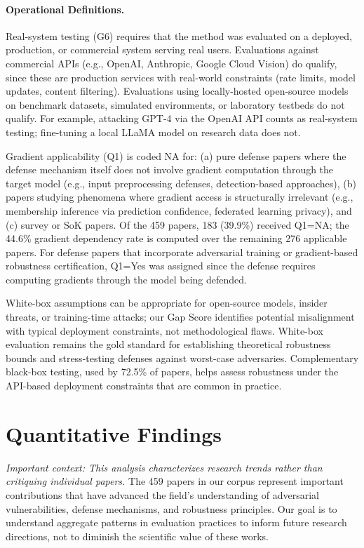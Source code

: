 \documentclass[runningheads]{llncs}
\begin{document}
\paragraph{Operational Definitions.} Real-system testing (G6) requires that the method was evaluated on a deployed, production, or commercial system serving real users. Evaluations against commercial APIs (e.g., OpenAI, Anthropic, Google Cloud Vision) do qualify, since these are production services with real-world constraints (rate limits, model updates, content filtering). Evaluations using locally-hosted open-source models on benchmark datasets, simulated environments, or laboratory testbeds do not qualify. For example, attacking GPT-4 via the OpenAI API counts as real-system testing; fine-tuning a local LLaMA model on research data does not.

Gradient applicability (Q1) is coded NA for: (a) pure defense papers where the defense mechanism itself does not involve gradient computation through the target model (e.g., input preprocessing defenses, detection-based approaches), (b) papers studying phenomena where gradient access is structurally irrelevant (e.g., membership inference via prediction confidence, federated learning privacy), and (c) survey or SoK papers. Of the 459 papers, 183 (39.9\%) received Q1=NA; the 44.6\% gradient dependency rate is computed over the remaining 276 applicable papers. For defense papers that incorporate adversarial training or gradient-based robustness certification, Q1=Yes was assigned since the defense requires computing gradients through the model being defended.

White-box assumptions can be appropriate for open-source models, insider threats, or training-time attacks; our Gap Score identifies potential misalignment with typical deployment constraints, not methodological flaws. White-box evaluation remains the gold standard for establishing theoretical robustness bounds and stress-testing defenses against worst-case adversaries. Complementary black-box testing, used by 72.5\% of papers, helps assess robustness under the API-based deployment constraints that are common in practice.

\section{Quantitative Findings}
\label{sec:findings}

\emph{Important context: This analysis characterizes research trends rather than critiquing individual papers.} The 459 papers in our corpus represent important contributions that have advanced the field's understanding of adversarial vulnerabilities, defense mechanisms, and robustness principles. Our goal is to understand aggregate patterns in evaluation practices to inform future research directions, not to diminish the scientific value of these works.
\end{document}
